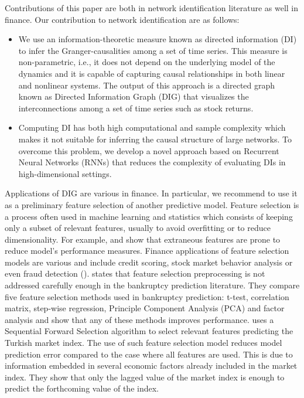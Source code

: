 Contributions of this paper are both in network identification literature as well in finance.
Our contribution to network identification are as follows:
\begin{itemize}
    \item We use an information-theoretic measure known as directed information (DI) to infer the Granger-causalities among a set of time series. 
This measure is non-parametric, i.e., it does not depend on the underlying model of the dynamics and it is capable of capturing causal relationships in both linear and nonlinear systems. The output of this approach is a directed graph known as Directed Information Graph (DIG) that visualizes the interconnections among a set of time series such as stock returns. 

\item Computing DI has both high computational and sample complexity which makes it not suitable for inferring the causal structure of large networks. 
To overcome this problem, we develop a novel approach based on Recurrent Neural Networks (RNNs) that reduces the complexity of evaluating DIs in high-dimensional settings. 
\end{itemize}



Applications of DIG are various in finance. 
In particular, we recommend to use it as a preliminary feature selection of another predictive model. Feature selection is a process often used in machine learning and statistics which consists of keeping only a subset of relevant features, usually to avoid overfitting or to reduce dimensionality. 
For example, \citet{fs1} and \citet{fs2} show that extraneous features are prone to reduce model's performance measures. 
Finance applications of feature selection models are various and include credit scoring, stock market behavior analysis  or even fraud detection (\citet{fs_fraud}).
\citet{tsai2009} states that feature selection preprocessing is not addressed carefully enough in the bankruptcy prediction literature. They compare five feature selection methods used in bankruptcy prediction: t-test, correlation matrix, step-wise regression, Principle Component Analysis (PCA) and factor analysis and show that any of these methods improves performance. 
\citet{fs_stock} uses a Sequential Forward Selection algorithm to select relevant features predicting the Turkish market index. The use of such feature selection model reduces model prediction error compared to the case where all features are used. This is due to information embedded in several economic factors already included in the market index. They show that only the lagged value of the market index is enough to predict the forthcoming value of the index.


